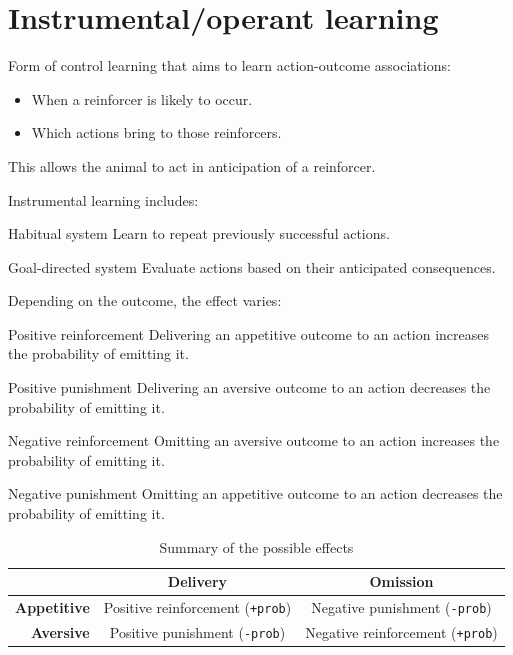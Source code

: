 \chapter{Instrumental/operant learning}


Form of control learning that aims to learn action-outcome associations:
\begin{itemize}
    \item When a reinforcer is likely to occur.
    \item Which actions bring to those reinforcers.
\end{itemize}
This allows the animal to act in anticipation of a reinforcer.

Instrumental learning includes:
\begin{descriptionlist}
    \item[Habitual system] 
        Learn to repeat previously successful actions.
    \item[Goal-directed system] 
        Evaluate actions based on their anticipated consequences.
\end{descriptionlist}

Depending on the outcome, the effect varies:
\begin{descriptionlist}
    \item[Positive reinforcement] 
        Delivering an appetitive outcome to an action increases the probability of emitting it.

    \item[Positive punishment] 
        Delivering an aversive outcome to an action decreases the probability of emitting it.
    
    \item[Negative reinforcement] 
        Omitting an aversive outcome to an action increases the probability of emitting it.
    
    \item[Negative punishment] 
        Omitting an appetitive outcome to an action decreases the probability of emitting it.
\end{descriptionlist}

\begin{table}[H]
    \centering
    \begin{tabular}{r|cc}
        \toprule
                            & \textbf{Delivery}                         & \textbf{Omission} \\
        \midrule
        \textbf{Appetitive} & Positive reinforcement (\texttt{+prob})   & Negative punishment (\texttt{-prob}) \\
        \textbf{Aversive}   & Positive punishment (\texttt{-prob})      & Negative reinforcement (\texttt{+prob}) \\
        \bottomrule
    \end{tabular}
    \caption{Summary of the possible effects}
\end{table}



